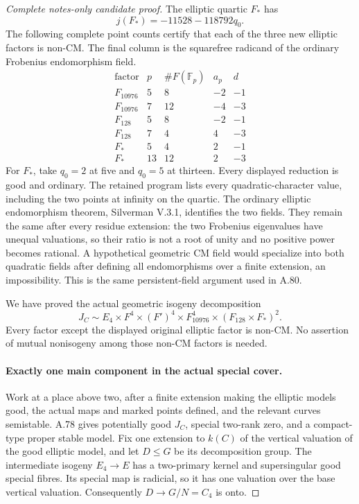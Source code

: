 \begin{proof}[Complete notes-only candidate proof]
The elliptic quartic \(F_*\) has
\[
       j(F_*)=-11528-118792q_0.                        \tag{FW.11}
\]
The following complete point counts certify that each of the three
new elliptic factors is non-CM. The final column is the squarefree
radicand of the ordinary Frobenius endomorphism field.
\[
 \begin{array}{c|r|r|r|r}
 \text{factor}&p&\#F(\mathbb F_p)&a_p&d\\ \hline
 F_{10976}&5&8&-2&-1\\
 F_{10976}&7&12&-4&-3\\
 F_{128}&5&8&-2&-1\\
 F_{128}&7&4&4&-3\\
 F_*&5&4&2&-1\\
 F_*&13&12&2&-3
 \end{array}                                         \tag{FW.12}
\]
For \(F_*\), take \(q_0=2\) at five and \(q_0=5\) at
thirteen. Every displayed reduction is good and ordinary. The
retained program lists every quadratic-character value, including
the two points at infinity on the quartic. The ordinary elliptic
endomorphism theorem, Silverman V.3.1, identifies the two fields.
They remain the same after every residue extension: the two
Frobenius eigenvalues have unequal valuations, so their ratio is
not a root of unity and no positive power becomes rational.
A hypothetical geometric CM field would specialize into both
quadratic fields after defining all endomorphisms over a finite
extension, an impossibility. This is the same persistent-field
argument used in A.80.

We have proved the actual geometric isogeny decomposition
\[
 J_C\sim E_4\times F^4\times(F')^4\times F_{10976}^4
                              \times(F_{128}\times F_*)^2.
                                                               \tag{FW.13}
\]
Every factor except the displayed original elliptic factor is
non-CM. No assertion of mutual nonisogeny among those non-CM
factors is needed.

\paragraph{Exactly one main component in the actual special cover.}
Work at a place above two, after a finite extension making the
elliptic models good, the actual maps and marked points defined,
and the relevant curves semistable. A.78 gives potentially good
\(J_C\), special two-rank zero, and a compact-type proper stable
model. Fix one extension to \(k(C)\) of the vertical valuation of
the good elliptic model, and let \(D\le G\) be its decomposition
group. The intermediate isogeny \(E_4\to E\) has a two-primary
kernel and supersingular good special fibres. Its special map is
radicial, so it has one valuation over the base vertical valuation.
Consequently \(D\to G/N=C_4\) is onto.


\end{proof}
